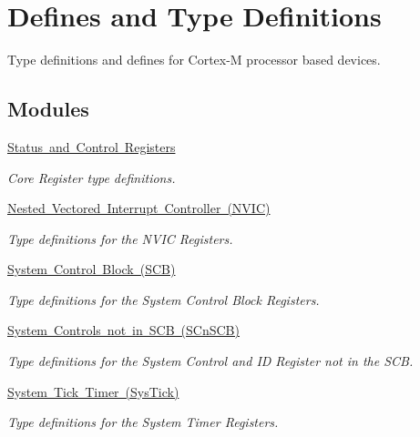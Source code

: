 \hypertarget{group___c_m_s_i_s__core__register}{}\section{Defines and Type Definitions}
\label{group___c_m_s_i_s__core__register}


Type definitions and defines for Cortex-\/M processor based devices.  


\subsection*{Modules}
\begin{DoxyCompactItemize}
\item 
\mbox{\hyperlink{group___c_m_s_i_s___c_o_r_e}{Status and Control Registers}}
\begin{DoxyCompactList}\small\item\em Core Register type definitions. \end{DoxyCompactList}\item 
\mbox{\hyperlink{group___c_m_s_i_s___n_v_i_c}{Nested Vectored Interrupt Controller (\+N\+V\+I\+C)}}
\begin{DoxyCompactList}\small\item\em Type definitions for the N\+V\+IC Registers. \end{DoxyCompactList}\item 
\mbox{\hyperlink{group___c_m_s_i_s___s_c_b}{System Control Block (\+S\+C\+B)}}
\begin{DoxyCompactList}\small\item\em Type definitions for the System Control Block Registers. \end{DoxyCompactList}\item 
\mbox{\hyperlink{group___c_m_s_i_s___s_cn_s_c_b}{System Controls not in S\+C\+B (\+S\+Cn\+S\+C\+B)}}
\begin{DoxyCompactList}\small\item\em Type definitions for the System Control and ID Register not in the S\+CB. \end{DoxyCompactList}\item 
\mbox{\hyperlink{group___c_m_s_i_s___sys_tick}{System Tick Timer (\+Sys\+Tick)}}
\begin{DoxyCompactList}\small\item\em Type definitions for the System Timer Registers. \end{DoxyCompactList}\item 

\end{DoxyCompactItemize}
